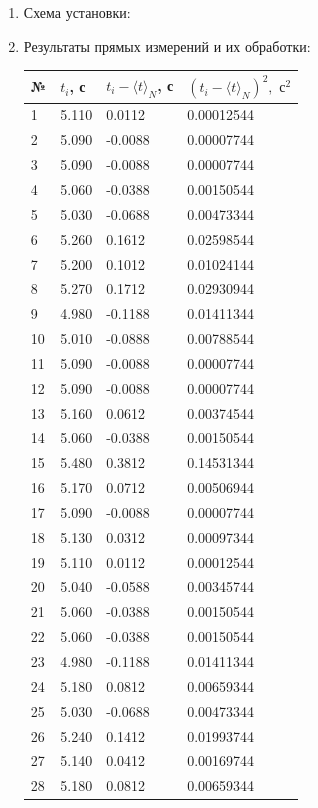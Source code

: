 \documentclass[12pt]{article}
\begin{document}
\begin{enumerate}
    \item Схема установки:

    \item Результаты прямых измерений и их обработки: \\
    \begin{tabular}[l]{|m{}|m{}|m{}|m{}|}
    \hline
    № & $t_i$, с & $t_i - \langle t\rangle_N$, с & $\left(t_i - \langle t\rangle_N\right)^2, \text{ с}^2$\\
    \hline
    1 & 5.110 & 0.0112 & 0.00012544 \\
    \hline
    2 & 5.090 & -0.0088 & 0.00007744 \\
    \hline
    3 & 5.090 & -0.0088 & 0.00007744 \\
    \hline
    4 & 5.060 & -0.0388 & 0.00150544 \\
    \hline
    5 & 5.030 & -0.0688 & 0.00473344 \\
    \hline
    6 & 5.260 & 0.1612 & 0.02598544 \\
    \hline
    7 & 5.200 & 0.1012 & 0.01024144 \\
    \hline
    8 & 5.270 & 0.1712 & 0.02930944 \\
    \hline
    9 & 4.980 & -0.1188 & 0.01411344 \\
    \hline
    10 & 5.010 & -0.0888 & 0.00788544 \\
    \hline
    11 & 5.090 & -0.0088 & 0.00007744 \\
    \hline
    12 & 5.090 & -0.0088 & 0.00007744 \\
    \hline
    13 & 5.160 & 0.0612 & 0.00374544 \\
    \hline
    14 & 5.060 & -0.0388 & 0.00150544 \\
    \hline
    15 & 5.480 & 0.3812 & 0.14531344 \\
    \hline
    16 & 5.170 & 0.0712 & 0.00506944 \\
    \hline
    17 & 5.090 & -0.0088 & 0.00007744 \\
    \hline
    18 & 5.130 & 0.0312 & 0.00097344 \\
    \hline
    19 & 5.110 & 0.0112 & 0.00012544 \\
    \hline
    20 & 5.040 & -0.0588 & 0.00345744 \\
    \hline
    21 & 5.060 & -0.0388 & 0.00150544 \\
    \hline
    22 & 5.060 & -0.0388 & 0.00150544 \\
    \hline
    23 & 4.980 & -0.1188 & 0.01411344 \\
    \hline
    24 & 5.180 & 0.0812 & 0.00659344 \\
    \hline
    25 & 5.030 & -0.0688 & 0.00473344 \\
    \hline
    26 & 5.240 & 0.1412 & 0.01993744 \\
    \hline
    27 & 5.140 & 0.0412 & 0.00169744 \\
    \hline
    28 & 5.180 & 0.0812 & 0.00659344 \\
    \hline
    \end{tabular}


\end{enumerate}
\end{document}
